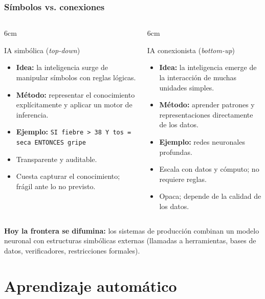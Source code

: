\documentclass[aspectratio=169, 10pt]{beamer}
\begin{document}
\begin{frame}
\frametitle{Símbolos vs. conexiones}
\begin{columns}[T]
\begin{column}{6cm}
\begin{block}{IA simbólica (\emph{top-down})}
\begin{itemize}
	\item \textbf{Idea:} la inteligencia surge de manipular s\'imbolos con reglas l\'ogicas.
	\item \textbf{M\'etodo:} representar el conocimiento expl\'icitamente y aplicar un motor de inferencia.
	\item \textbf{Ejemplo:} \texttt{SI fiebre > 38 Y tos = seca ENTONCES gripe}
	\item[+] Transparente y auditable.
	\item[--] Cuesta capturar el conocimiento; fr\'agil ante lo no previsto.
\end{itemize}
\end{block}
\end{column}
\begin{column}{6cm}
\begin{block}{IA conexionista (\emph{bottom-up})}
\begin{itemize}
	\item \textbf{Idea:} la inteligencia emerge de la interacci\'on de muchas unidades simples.
	\item \textbf{M\'etodo:} aprender patrones y representaciones directamente de los datos.
	\item \textbf{Ejemplo:} redes neuronales profundas.
	\item[+] Escala con datos y c\'omputo; no requiere reglas.
	\item[--] Opaca; depende de la calidad de los datos.
\end{itemize}
\end{block}
\end{column}
\end{columns}
\vspace{0.4em}
\pause
\footnotesize
\textbf{Hoy la frontera se difumina:} los sistemas de producci\'on combinan un modelo neuronal con estructuras simb\'olicas externas (llamadas a herramientas, bases de datos, verificadores, restricciones formales).
\end{frame}

\section{Aprendizaje automático}
\end{document}

